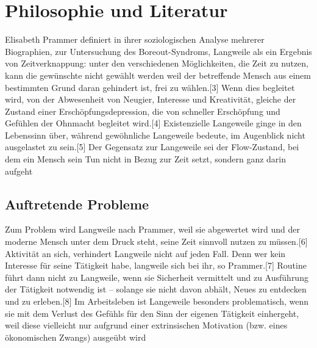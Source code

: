 
\chapter{Philosophie und Literatur}
\label{chapter-Soziologie}

Elisabeth Prammer definiert in ihrer soziologischen Analyse mehrerer Biographien, zur Untersuchung des Boreout-Syndroms, Langweile als ein Ergebnis von Zeitverknappung: unter den verschiedenen Möglichkeiten, die Zeit zu nutzen, kann die gewünschte nicht gewählt werden weil der betreffende Mensch aus einem bestimmten Grund daran gehindert ist, frei zu wählen.[3] Wenn dies begleitet wird, von der Abwesenheit von Neugier, Interesse und Kreativität, gleiche der Zustand einer Erschöpfungsdepression, die von schneller Erschöpfung und Gefühlen der Ohnmacht begleitet wird.[4] Existenzielle Langeweile ginge in den Lebenssinn über, während gewöhnliche Langeweile bedeute, im Augenblick nicht ausgelastet zu sein.[5] Der Gegensatz zur Langeweile sei der Flow-Zustand, bei dem ein Mensch sein Tun nicht in Bezug zur Zeit setzt, sondern ganz darin aufgeht

\section{Auftretende Probleme}

Zum Problem wird Langweile nach Prammer, weil sie abgewertet wird und der moderne Mensch unter dem Druck steht, seine Zeit sinnvoll nutzen zu müssen.[6] Aktivität an sich, verhindert Langweile nicht auf jeden Fall. Denn wer kein Interesse für seine Tätigkeit habe, langweile sich bei ihr, so Prammer.[7] Routine führt dann nicht zu Langweile, wenn sie Sicherheit vermittelt und zu Ausführung der Tätigkeit notwendig ist – solange sie nicht davon abhält, Neues zu entdecken und zu erleben.[8] Im Arbeitsleben ist Langeweile besonders problematisch, wenn sie mit dem Verlust des Gefühls für den Sinn der eigenen Tätigkeit einhergeht, weil diese vielleicht nur aufgrund einer extrinsischen Motivation (bzw. eines ökonomischen Zwangs) ausgeübt wird

